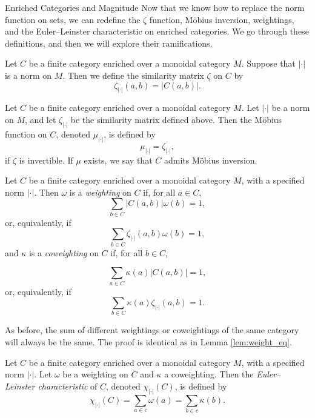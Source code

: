\documentclass[12pt]{pom_thesis}
\begin{document}
\begin{chapter}{Enriched Categories and Magnitude}
Now that we know how to replace the norm function on sets, we can redefine the $\zeta$ function, M\"obius inversion, weightings, and the Euler--Leinster characteristic on enriched categories. We go through these definitions, and then we will explore their ramifications.
\begin{defn}
Let $C$ be a finite category enriched over a monoidal category $M$. Suppose that $|\cdot|$ is a norm on $M$. Then we define the similarity matrix $\zeta$ on $C$ by
\[
\zeta_{|\cdot|}(a,b) = |C(a,b)|.
\]
\end{defn}

\begin{defn}
Let $C$ be a finite category enriched over a monoidal category $M$. Let $|\cdot|$ be a norm on $M$, and let $\zeta_{|\cdot|}$ be the similarity matrix defined above. Then the M\"obius function on $C$, denoted $\mu_{|\cdot|}$, is defined by 
\[
\mu_{|\cdot|} = \zeta_{|\cdot|},
\]
if $\zeta$ is invertible. If $\mu$ exists, we say that $C$ admits M\"obius inversion.
\end{defn}

\begin{defn}
Let $C$ be a finite category enriched over a monoidal category $M$, with a specified norm $|\cdot|$. Then $\omega$ is a \emph{weighting} on $C$ if, for all $a \in C$, 
\[
\sum_{b \in C}|C(a,b)|\omega(b) = 1,
\]
or, equivalently, if
\[
\sum_{b \in C}\zeta_{|\cdot|}(a,b)\omega(b) = 1,
\]
and $\kappa$ is a \emph{coweighting} on $C$ if, for all $b \in C$,

\[
\sum_{a \in C}\kappa(a)|C(a,b)|= 1,
\]
or, equivalently, if
\[
\sum_{b \in C}\kappa(a)\zeta_{|\cdot|}(a,b) = 1.
\]
\end{defn}
As before, the sum of different weightings or coweightings of the same category will always be the same. The proof is identical as in Lemma \ref{lem:weight_eq}.
\begin{defn}
Let $C$ be a finite category enriched over a monoidal category $M$, with a specified norm $|\cdot|$. Let $\omega$ be a weighting on $C$ and $\kappa$ a coweighting. Then the \emph{Euler--Leinster characteristic} of $C$, denoted $\chi_{|\cdot|}(C)$, is defined by
\[
\chi_{|\cdot|}(C) = \sum_{a \in c} \omega(a) = \sum_{b \in c} \kappa(b).
\]
\end{defn}


\end{chapter}
\end{document}
